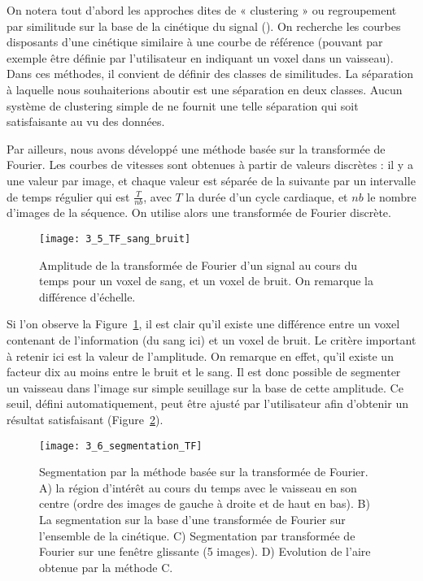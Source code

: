 On notera tout d’abord les approches dites de « clustering » ou regroupement par similitude sur
la base de la cinétique du signal (\cite{Gaffney2004}). On recherche les courbes disposants d’une cinétique similaire à
une courbe de référence (pouvant par exemple être définie par l’utilisateur en indiquant un voxel dans
un vaisseau). Dans ces méthodes, il convient de définir des classes de similitudes. La séparation à
laquelle nous souhaiterions aboutir est une séparation en deux classes. Aucun système de clustering
simple de ne fournit une telle séparation qui soit satisfaisante au vu des données.

Par ailleurs, nous avons développé une méthode basée sur la transformée de Fourier. Les courbes
de vitesses sont obtenues à partir de valeurs discrètes : il y a une valeur par image, et chaque valeur
est séparée de la suivante par un intervalle de temps régulier qui est $\frac{T}{nb}$, avec $T$ la durée d’un cycle
cardiaque, et $nb$ le nombre d’images de la séquence. On utilise alors une transformée de Fourier
discrète. 
\begin{figure}[!b]
\centering
\texttt{[image: 3\_5\_TF\_sang\_bruit]}
\caption{Amplitude de la transformée de Fourier d’un signal au cours du temps pour un voxel de sang, et un voxel de bruit.
On remarque la différence d'échelle.}
\label{fig:3_5_TF_sang_bruit}	
\end{figure}
Si l’on observe la Figure~\ref{fig:3_5_TF_sang_bruit}, il est clair qu’il existe une différence entre un voxel contenant de
l’information (du sang ici) et un voxel de bruit. Le critère important à retenir ici est la valeur de
l’amplitude. On remarque en effet, qu’il existe un facteur dix au moins entre le bruit et le sang. Il est
donc possible de segmenter un vaisseau dans l’image sur simple seuillage sur la base de cette
amplitude. Ce seuil, défini automatiquement, peut être ajusté par l’utilisateur afin d’obtenir un résultat
satisfaisant (Figure~\ref{fig:3_6_segmentation_TF}).
\begin{figure}[!t]
\centering
\texttt{[image: 3\_6\_segmentation\_TF]}
\caption{Segmentation par la méthode basée sur la transformée de Fourier. A) la région d’intérêt au cours du temps avec
le vaisseau en son centre (ordre des images de gauche à droite et de haut en bas). B) La segmentation sur la base d’une
transformée de Fourier sur l’ensemble de la cinétique. C) Segmentation par transformée de Fourier sur une fenêtre glissante
(5 images). D) Evolution de l’aire obtenue par la méthode C.}
\label{fig:3_6_segmentation_TF}	
\end{figure}
